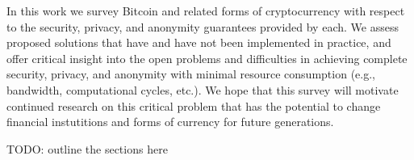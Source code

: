 In this work we survey Bitcoin and related forms of cryptocurrency with respect to the security, privacy, and anonymity guarantees provided by each. We assess proposed solutions that have and have not been implemented in practice, and offer critical insight into the open problems and difficulties in achieving complete security, privacy, and anonymity with minimal resource consumption (e.g., bandwidth, computational cycles, etc.). We hope that this survey will motivate continued research on this critical problem that has the potential to change financial instutitions and forms of currency for future generations.

TODO: outline the sections here